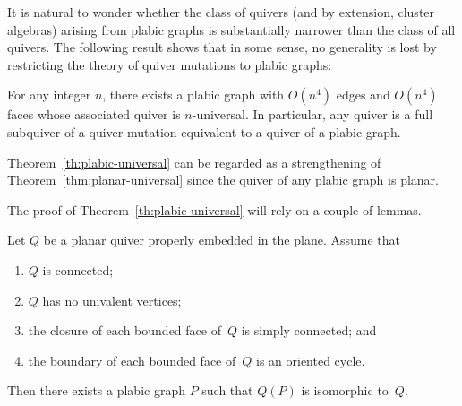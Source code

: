 \documentclass[ALCO,ThmDefs,Unicode,epreuves,published]{cedram}
\begin{document}
It is natural to wonder whether the class of quivers (and by extension, cluster algebras)
arising from plabic graphs is substantially narrower than the class of all quivers. 
The following result shows that in some sense, no generality is lost 
by restricting the theory of quiver mutations to plabic graphs:

\begin{theorem}
\label{th:plabic-universal}
For any integer $n$, there exists a plabic graph with $O(n^4)$ edges and $O(n^4)$ faces 
whose associated quiver is $n$-universal. 
In particular, any quiver is a full subquiver of a quiver
mutation equivalent to a quiver of a plabic graph. 
\end{theorem}

Theorem~\ref{th:plabic-universal}
can be regarded as a strengthening of Theorem~\ref{thm:planar-universal} 
since the quiver of any plabic graph is planar.

The proof of Theorem~\ref{th:plabic-universal} will rely on a couple of lemmas.

\goodbreak
\begin{lemma}
\label{lem:quivers-from-plabic}
Let $Q$ be a planar quiver properly embedded in the plane. 
Assume that 
\begin{enumerate}[label=(\alph*)]
\item\label{lemma3.7_a} %
$Q$ is connected; 
\item\label{lemma3.7_b} %
$Q$ has no univalent vertices; 
\item\label{lemma3.7_c} %
the closure of each bounded face of~$Q$ is simply connected; and 
\item\label{lemma3.7_d} %
the boundary of each bounded face of~$Q$ is an oriented cycle.
\end{enumerate}
Then %
there exists a plabic graph $P$ such that $Q(P)$ is isomorphic to~$Q$. 
\end{lemma}
\end{document}
